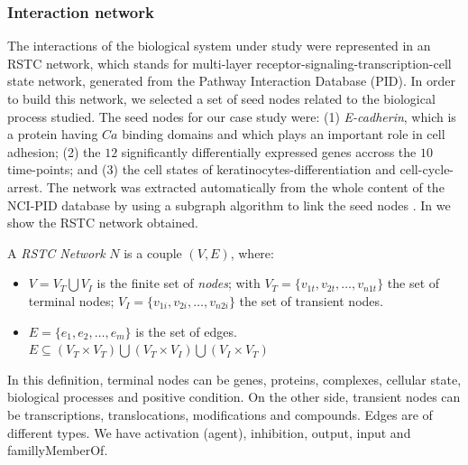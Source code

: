 \subsubsection{Interaction network}
\label{ssec:RSTC}
The interactions of the biological system under study were represented in
 an RSTC network, which stands for  multi-layer receptor-signaling-transcription-cell state network, generated from the Pathway Interaction Database (PID).
In order to build this network, we selected a set of seed nodes related to the biological process studied.
The seed nodes for our case study were:  (1) \emph{E-cadherin}, which is a protein having $Ca$ binding domains and which plays an important role in cell adhesion;
(2) the $12$ significantly differentially expressed genes accross the $10$ time-points; and (3) the cell states of keratinocytes-differentiation and cell-cycle-arrest. 
The network was extracted automatically from the whole content of the NCI-PID database by using a subgraph algorithm to link the seed nodes \cite{guziolowski2012automatic}. 
In  we show the RSTC network obtained. 

\begin{definition} \label{def:RSTCDef}
A \emph{RSTC Network} $N$ is a couple $(V,E)$, where:
\begin{itemize}
\item $V =V_{T} \bigcup V_{I} $ is the finite set of \emph{nodes};
 with 
  $V_{T} = \{v_{1t},v_{2t}, \dots ,v_{n1t} \} $ the set of terminal nodes;
  $V_{I} = \{v_{1i},v_{2i}, \dots ,v_{n2i} \} $ the set of transient nodes.
\item $E = \{e_{1},e_{2}, \dots, e_{m} \}$ is the set of edges. $ E \subseteq (V_{T} \times V_{T}) \bigcup (V_{T} \times V_{I}) 
\bigcup (V_{I} \times V_{T})$
\end{itemize}
\end{definition}

In this definition, terminal nodes can be genes, proteins, complexes, cellular state, biological processes and positive condition. 
On the other side, transient nodes can be transcriptions, translocations, modifications and compounds. Edges are of different types.
We have activation (agent), inhibition, output, input and famillyMemberOf.

